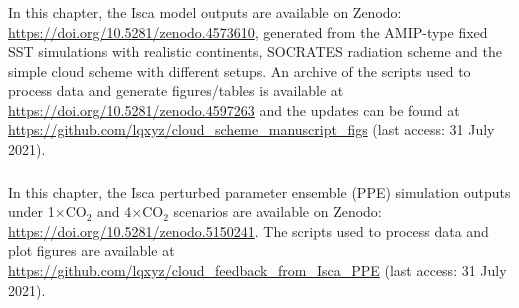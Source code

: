 \subsubsection{}

In this chapter, the Isca model outputs are available on Zenodo: \url{https://doi.org/10.5281/zenodo.4573610}, generated from the AMIP-type fixed SST simulations with realistic continents, SOCRATES radiation scheme and the simple cloud scheme with different setups. An archive of the scripts used to process data and generate figures/tables is available at \url{https://doi.org/10.5281/zenodo.4597263} and the updates can be found at \url{https://github.com/lqxyz/cloud_scheme_manuscript_figs} (last access: 31 July 2021).

\subsubsection{}

In this chapter, the Isca perturbed parameter ensemble (PPE) simulation outputs under 1$\times$CO$_2$ and 4$\times$CO$_2$ scenarios are available on Zenodo: \url{https://doi.org/10.5281/zenodo.5150241}. The scripts used to process data and plot figures are available at \url{https://github.com/lqxyz/cloud_feedback_from_Isca_PPE} (last access: 31 July 2021).
